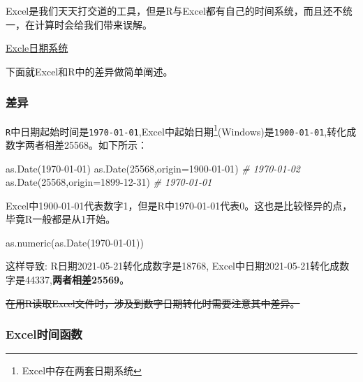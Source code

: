 \documentclass[
]{book}
\newenvironment{Shaded}{\begin{snugshade}}{\end{snugshade}}
\newcommand{\AttributeTok}[1]{\textcolor[rgb]{0.77,0.63,0.00}{#1}}
\newcommand{\CommentTok}[1]{\textcolor[rgb]{0.56,0.35,0.01}{\textit{#1}}}
\newcommand{\DecValTok}[1]{\textcolor[rgb]{0.00,0.00,0.81}{#1}}
\newcommand{\FunctionTok}[1]{\textcolor[rgb]{0.00,0.00,0.00}{#1}}
\newcommand{\NormalTok}[1]{#1}
\newcommand{\StringTok}[1]{\textcolor[rgb]{0.31,0.60,0.02}{#1}}
\begin{document}
Excel是我们天天打交道的工具，但是R与Excel都有自己的时间系统，而且还不统一，在计算时会给我们带来误解。

\href{https://support.microsoft.com/zh-cn/office/excel-\%e4\%b8\%ad\%e7\%9a\%84\%e6\%97\%a5\%e6\%9c\%9f\%e7\%b3\%bb\%e7\%bb\%9f-e7fe7167-48a9-4b96-bb53-5612a800b487?ui=zh-CN\&rs=zh-CN\&ad=CN}{Excle日期系统}

下面就Excel和R中的差异做简单阐述。

\hypertarget{ux5deeux5f02}{%
\subsubsection{差异}\label{ux5deeux5f02}}

\texttt{R}中日期起始时间是\texttt{1970-01-01},Excel中起始日期\footnote{Excel中存在两套日期系统}(Windows)是\texttt{1900-01-01},转化成数字两者相差25568。如下所示：

\begin{Shaded}
\begin{Highlighting}[]
\FunctionTok{as.Date}\NormalTok{(}\StringTok{\textquotesingle{}1970{-}01{-}01\textquotesingle{}}\NormalTok{)}
\FunctionTok{as.Date}\NormalTok{(}\DecValTok{25568}\NormalTok{,}\AttributeTok{origin=}\StringTok{\textquotesingle{}1900{-}01{-}01\textquotesingle{}}\NormalTok{) }\CommentTok{\# 1970{-}01{-}02}
\FunctionTok{as.Date}\NormalTok{(}\DecValTok{25568}\NormalTok{,}\AttributeTok{origin=}\StringTok{\textquotesingle{}1899{-}12{-}31\textquotesingle{}}\NormalTok{) }\CommentTok{\# 1970{-}01{-}01}
\end{Highlighting}
\end{Shaded}

Excel中1900-01-01代表数字1，但是R中1970-01-01代表0。这也是比较怪异的点，毕竟R一般都是从1开始。

\begin{Shaded}
\begin{Highlighting}[]
\FunctionTok{as.numeric}\NormalTok{(}\FunctionTok{as.Date}\NormalTok{(}\StringTok{\textquotesingle{}1970{-}01{-}01\textquotesingle{}}\NormalTok{))}
\end{Highlighting}
\end{Shaded}

这样导致:
R日期2021-05-21转化成数字是18768,
Excel中日期2021-05-21转化成数字是44337,\textbf{两者相差25569}。

\sout{在用R读取Excel文件时，涉及到数字日期转化时需要注意其中差异。}

\hypertarget{excelux65f6ux95f4ux51fdux6570}{%
\subsubsection{Excel时间函数}\label{excelux65f6ux95f4ux51fdux6570}}
\end{document}
